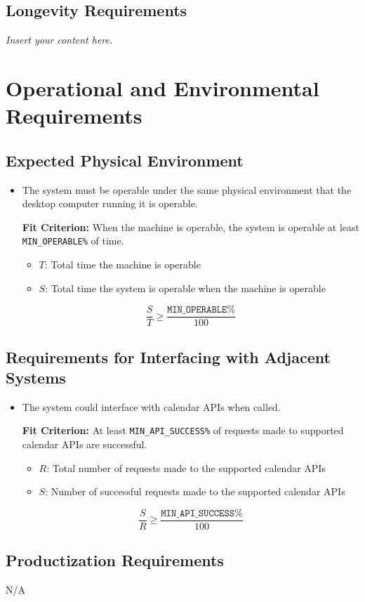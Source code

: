 \documentclass[12pt]{article}
\newcommand{\lips}{\textit{Insert your content here.}}
\newcounter{nfrnum} %
\newcommand{\rthenfrnum}{NFR\refstepcounter{nfrnum}\thenfrnum:}
\begin{document}
\subsection{Longevity Requirements}
\lips

\section{Operational and Environmental Requirements}
\subsection{Expected Physical Environment}
\begin{itemize}
\item[\rthenfrnum]
The system must be operable under the same physical environment that the desktop computer running it is operable.

\textbf{Fit Criterion:} When the machine is operable, the system is operable at least \texttt{MIN\_OPERABLE\%} of time.
\begin{itemize}
    \item \( T \): Total time the machine is operable
    \item \( S \): Total time the system is operable when the machine is operable
\end{itemize}
\[
    \frac{S}{T} \geq \frac{\texttt{MIN\_OPERABLE\%}}{100}
\]
\end{itemize}
\subsection{Requirements for Interfacing with Adjacent Systems}
\begin{itemize}
\item[\rthenfrnum]
The system could interface with calendar APIs when called.

\textbf{Fit Criterion:} At least \texttt{MIN\_API\_SUCCESS\%} of requests made to supported calendar APIs are successful.
\begin{itemize}
    \item \( R \): Total number of requests made to the supported calendar APIs
    \item \( S \): Number of successful requests made to the supported calendar APIs
\end{itemize}
\[
    \frac{S}{R} \geq \frac{\texttt{MIN\_API\_SUCCESS\%}}{100}
\]
\end{itemize}
\subsection{Productization Requirements}
N/A
\end{document}
